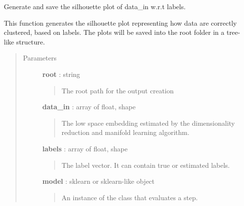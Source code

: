 \documentclass[letterpaper,10pt,english]{sphinxmanual}
\begin{document}
\begin{fulllineitems}
\label{index:adenine.core.plotting.silhouette}
Generate and save the silhouette plot of data\_in w.r.t labels.

This function generates the silhouette plot representing how data are
correctly clustered, based on labels.
The plots will be saved into the root folder in a tree-like structure.
\begin{quote}\begin{description}
\item[{Parameters}] \leavevmode
\textbf{root} : string
\begin{quote}

The root path for the output creation
\end{quote}

\textbf{data\_in} : array of float, shape
\begin{quote}

The low space embedding estimated by the dimensionality reduction and
manifold learning algorithm.
\end{quote}

\textbf{labels} : array of float, shape
\begin{quote}

The label vector. It can contain true or estimated labels.
\end{quote}

\textbf{model} : sklearn or sklearn-like object
\begin{quote}

An instance of the class that evaluates a step.
\end{quote}

\end{description}\end{quote}

\end{fulllineitems}

\end{document}
